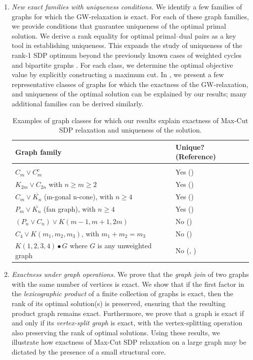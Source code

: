\documentclass[a4paper,fleqn]{cas-sc}
\newcommand{\1}{\mathbf{1}}
\begin{document}
\begin{enumerate}
    
    \item \textit{New exact families with uniqueness conditions.} We identify a few families of graphs for which the GW-relaxation is exact. For each of these graph families, we provide conditions that guarantee uniqueness of the optimal primal solution. We derive a rank equality for optimal primal--dual pairs as a key tool in establishing uniqueness. This expands the study of uniqueness of the rank-1 SDP optimum beyond the previously known cases of weighted cycles \citep{hong} and bipartite graphs \citep{mirka2024max}. For each class, we determine the optimal objective value by explicitly constructing a maximum cut. In , we present a few representative classes of graphs for which the exactness of the GW-relaxation, and uniqueness of the optimal solution can be explained by our results; many additional families can be derived similarly.

\begin{table}[h]
\centering
\caption{\centering Examples of graph classes for which our results explain exactness of Max-Cut SDP relaxation and uniqueness of the solution.\\[2mm]}
\label{tab:exact-examples}
\begin{tabular}{p{6.75cm}P{5.3cm}}
\toprule 
\textbf{Graph family} & \textbf{Unique? (Reference)}\\
\bottomrule\\\addlinespace[-1em]
$C_{m}\vee C^c_{m}$ & Yes () \\[2pt]
$K_{2m }\vee C_{2n}$ with $n \ge m \ge 2$ & Yes () \\[2pt]
$C_m \vee \overline{K_n}$ (m-gonal n-cone), with $n \geq 4$ & Yes () \\[2pt]
$P_m \vee \overline{K_n}$ (fan graph), with $n \geq 4$ & Yes () \\ [2pt]
$(P_{n} \vee C_n) \vee K(m-1,m+1,2m)$ & No  ()\\[2pt]
$C_4\vee K(m_1,m_2,m_3)$, with $m_1+m_2 = m_3$ & No ()\\ [2pt]
$K(1,2,3,4) \bullet G$ where $G$ is any unweighted graph & No (, )\\ 
\hline
\end{tabular}
\end{table}

    
\item \textit{Exactness under graph operations.} We prove that the \textit{graph join} of two graphs with the same number of vertices is exact. We show that if the first factor in the \textit{lexicographic product} of a finite collection of graphs is exact, then the rank of its optimal solution(s) is preserved, ensuring that the resulting product graph remains exact. Furthermore, we prove that a graph is exact if and only if its \textit{vertex-split graph} is exact, with the vertex-splitting operation also preserving the rank of optimal solutions. Using these results, we illustrate how exactness of Max-Cut SDP relaxation on a large graph may be dictated by the presence of a small structural core.
    

\end{enumerate}
\end{document}
